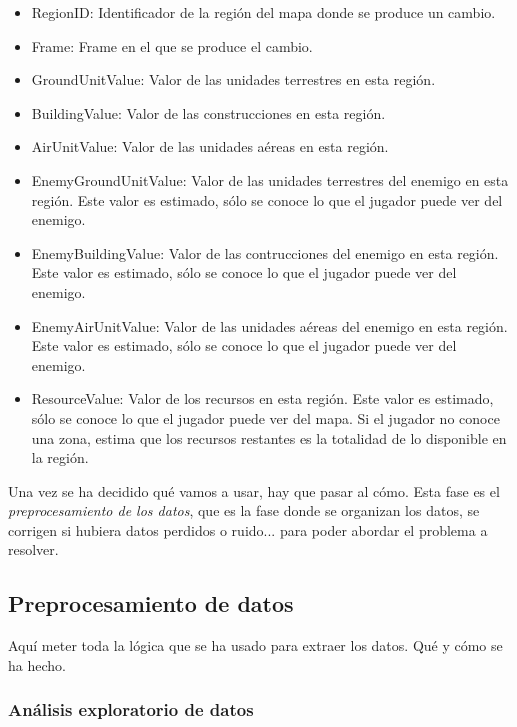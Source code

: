 \documentclass[a4paper,11pt]{book}\usepackage[]{graphicx}\usepackage[]{color}
\theoremstyle{plain}
\theoremstyle{definition}
\begin{document}
\begin{itemize}
\begin{itemize}
    \item RegionID: Identificador de la región del mapa donde se produce un cambio.
    \item Frame: Frame en el que se produce el cambio.
    \item GroundUnitValue: Valor de las unidades terrestres en esta región.
    \item BuildingValue: Valor de las construcciones en esta región.
    \item AirUnitValue: Valor de las unidades aéreas en esta región.
    \item EnemyGroundUnitValue: Valor de las unidades terrestres del enemigo en esta región.
    Este valor es estimado, sólo se conoce lo que el jugador puede ver del enemigo.
    \item EnemyBuildingValue: Valor de las contrucciones del enemigo en esta región.
    Este valor es estimado, sólo se conoce lo que el jugador puede ver del enemigo.
    \item EnemyAirUnitValue: Valor de las unidades aéreas del enemigo en esta región.
    Este valor es estimado, sólo se conoce lo que el jugador puede ver del enemigo.
    \item ResourceValue: Valor de los recursos en esta región. Este valor es estimado,
    sólo se conoce lo que el jugador puede ver del mapa. Si el jugador no conoce una zona, estima que los recursos restantes es la totalidad de lo disponible en la región.
  \end{itemize}
\end{itemize}

Una vez se ha decidido qué vamos a usar, hay que pasar al cómo. Esta fase es el \emph{preprocesamiento de los datos}, que es la fase donde se organizan los datos, se corrigen si hubiera datos perdidos o ruido... para poder abordar el problema a resolver.

\subsection{Preprocesamiento de datos}
\label{subsec:preprocesamiento}


Aquí meter toda la lógica que se ha usado para extraer los datos. Qué y cómo se ha hecho.

\subsubsection{Análisis exploratorio de datos}
\label{subsubsec:exploratorio}
\end{document}
